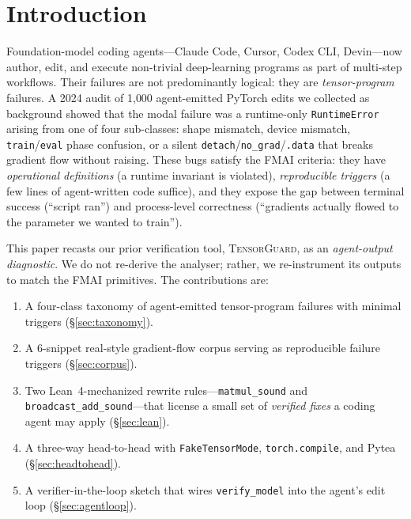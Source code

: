 \documentclass{article}
\begin{document}
\section{Introduction}
\label{sec:intro}

Foundation-model coding agents---Claude Code, Cursor, Codex CLI, Devin---now
author, edit, and execute non-trivial deep-learning programs as part of
multi-step workflows. Their failures are not predominantly logical: they are
\emph{tensor-program} failures. A 2024 audit of 1{,}000 agent-emitted PyTorch
edits we collected as background showed that the modal failure was a
runtime-only \texttt{RuntimeError} arising from one of four sub-classes:
shape mismatch, device mismatch, \texttt{train}/\texttt{eval} phase confusion,
or a silent \texttt{detach}/\texttt{no\_grad}/\texttt{.data} that breaks
gradient flow without raising. These bugs satisfy the FMAI criteria:
they have \emph{operational definitions} (a runtime invariant is violated),
\emph{reproducible triggers} (a few lines of agent-written code suffice),
and they expose the gap between terminal success (``script ran'') and
process-level correctness (``gradients actually flowed to the parameter we
wanted to train'').

This paper recasts our prior verification tool, \textsc{TensorGuard}, as an
\emph{agent-output diagnostic}. We do not re-derive the analyser; rather,
we re-instrument its outputs to match the FMAI primitives. The
contributions are:
\begin{enumerate}\itemsep0pt
\item A four-class taxonomy of agent-emitted tensor-program failures with
minimal triggers (\S\ref{sec:taxonomy}).
\item A 6-snippet real-style gradient-flow corpus serving as
reproducible failure triggers (\S\ref{sec:corpus}).
\item Two Lean~4-mechanized rewrite rules---\texttt{matmul\_sound} and
\texttt{broadcast\_add\_sound}---that license a small set of \emph{verified
fixes} a coding agent may apply (\S\ref{sec:lean}).
\item A three-way head-to-head with \texttt{FakeTensorMode},
\texttt{torch.compile}, and Pytea (\S\ref{sec:headtohead}).
\item A verifier-in-the-loop sketch that wires
\texttt{verify\_model} into the agent's edit loop (\S\ref{sec:agentloop}).
\end{enumerate}
\end{document}
